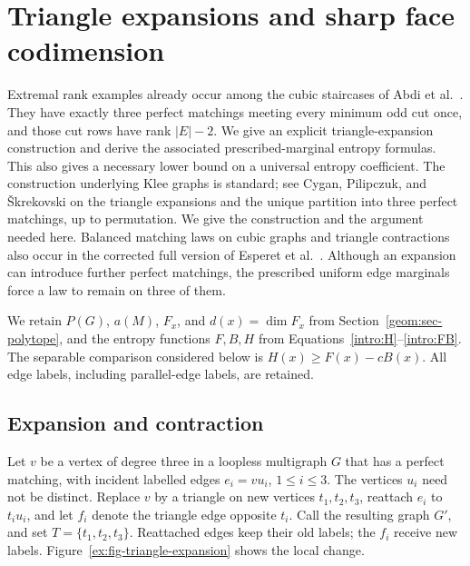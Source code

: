 \section{Triangle expansions and sharp face codimension}
\label{ex:sec-triangle-expansions}

Extremal rank examples already occur among the cubic staircases of
Abdi et al.~\cite[discussion after Corollary~6.6 and Figure~2]{AbdiCornuejolsDadushDalirrooyfard2026}.
They have exactly three perfect matchings meeting every minimum odd
cut once, and those cut rows have rank \(|E|-2\).
We give an explicit triangle-expansion construction and derive the
associated prescribed-marginal entropy formulas. This also gives
a necessary lower bound on a universal entropy coefficient.
The construction underlying Klee graphs is standard;
see Cygan, Pilipczuk, and \v{S}krekovski
\citep[Section~1 and Lemma~2.1]{CyganPilipczukSkrekovski2013}
on the triangle expansions and the unique partition into three perfect
matchings, up to permutation. We give the construction and the argument
needed here. Balanced matching laws on cubic graphs and triangle
contractions also occur in the corrected full version of
Esperet et al.~\cite[Claim~3 and Lemma~10]{EsperetEtAl2011}.
Although an expansion can introduce further perfect
matchings, the prescribed uniform edge marginals force a law to
remain on three of them.

We retain \(P(G)\), \(a(M)\), \(F_x\), and \(d(x)=\dim F_x\)
from Section~\ref{geom:sec-polytope}, and the entropy functions
\(F,B,H\) from Equations~\eqref{intro:H}--\eqref{intro:FB}.
The separable comparison considered below is
\(H(x)\ge F(x)-cB(x)\). All edge labels, including parallel-edge
labels, are retained.

\subsection{Expansion and contraction}

Let \(v\) be a vertex of degree three in a loopless multigraph
\(G\) that has a perfect matching, with incident labelled edges
\(e_i=vu_i\), \(1\le i\le3\).
The vertices \(u_i\) need not be distinct. Replace \(v\) by a
triangle on new vertices \(t_1,t_2,t_3\), reattach \(e_i\) to
\(t_i u_i\), and let \(f_i\) denote the triangle edge opposite
\(t_i\). Call the resulting graph \(G'\), and set
\(T=\{t_1,t_2,t_3\}\). Reattached edges keep their old labels;
the \(f_i\) receive new labels. Figure~\ref{ex:fig-triangle-expansion}
shows the local change.

